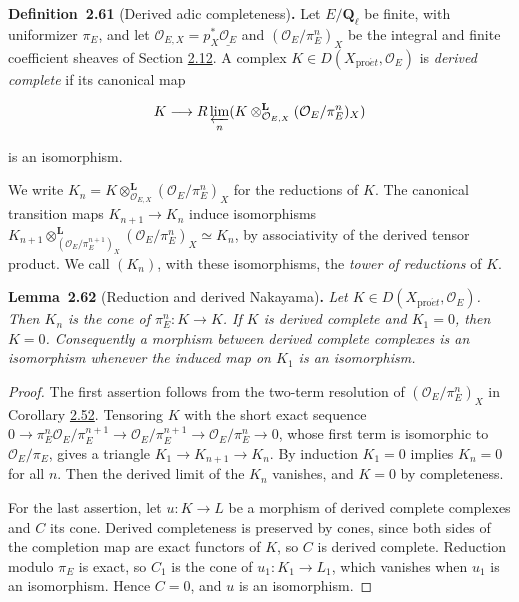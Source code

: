 \documentclass[11pt]{article}
\newenvironment{bpstatement}[2]{\par\addvspace{0.6\baselineskip}\noindent\textbf{#1}#2\textbf{.}\enspace\ignorespaces}
  {\par\addvspace{0.4\baselineskip}}
\newenvironment{bpstatementit}[2]{\begin{bpstatement}{#1}{#2}\itshape\ignorespaces}{\end{bpstatement}}
\begin{document}
\label{bp186}%
\begin{bpstatement}{Definition~2.61}{ (Derived adic completeness)}
Let \(E/\mathbf Q_\ell\) be finite, with uniformizer \(\pi_E\), and let \(\mathcal O_{E,X}=p_X^*\underline{\mathcal O_E}\) and \((\mathcal O_E/\pi_E^n)_X\) be the integral and finite coefficient sheaves of Section \hyperref[bp147]{2.12}. A complex \(K\in D(X_{\mathrm{pro}\acute{e}t},\mathcal O_E)\) is \emph{derived complete} if its canonical map

\[
K\longrightarrow R\varprojlim_n
(K\otimes^{\mathbf L}_{\mathcal O_{E,X}}(\mathcal O_E/\pi_E^{n})_X)
\]

is an isomorphism.
\end{bpstatement}

\label{bp187}%
We write \(K_n=K\otimes^{\mathbf L}_{\mathcal O_{E,X}}(\mathcal O_E/\pi_E^{n})_X\) for the reductions of \(K\). The canonical transition maps \(K_{n+1}\to K_n\) induce isomorphisms \(K_{n+1}\otimes^{\mathbf L}_{(\mathcal O_E/\pi_E^{n+1})_X}(\mathcal O_E/\pi_E^{n})_X\simeq K_n\), by associativity of the derived tensor product. We call \((K_n)\), with these isomorphisms, the \emph{tower of reductions} of \(K\).

\label{bp188}%
\begin{bpstatementit}{Lemma~2.62}{ (Reduction and derived Nakayama)}
Let \(K\in D(X_{\mathrm{pro}\acute{e}t},\mathcal O_E)\). Then \(K_n\) is the cone of \(\pi_E^n:K\to K\). If \(K\) is derived complete and \(K_1=0\), then \(K=0\). Consequently a morphism between derived complete complexes is an isomorphism whenever the induced map on \(K_1\) is an isomorphism.
\end{bpstatementit}

\begin{proof}[{Proof}]\label{bp189}%
The first assertion follows from the two-term resolution of \((\mathcal O_E/\pi_E^n)_X\) in Corollary \hyperref[bp159]{2.52}. Tensoring \(K\) with the short exact sequence \(0\to\pi_E^n\mathcal O_E/\pi_E^{n+1}\to\mathcal O_E/\pi_E^{n+1}\to
\mathcal O_E/\pi_E^n\to0\), whose first term is isomorphic to \(\mathcal O_E/\pi_E\), gives a triangle \(K_1\to K_{n+1}\to K_n\). By induction \(K_1=0\) implies \(K_n=0\) for all \(n\). Then the derived limit of the \(K_n\) vanishes, and \(K=0\) by completeness.

For the last assertion, let \(u:K\to L\) be a morphism of derived complete complexes and \(C\) its cone. Derived completeness is preserved by cones, since both sides of the completion map are exact functors of \(K\), so \(C\) is derived complete. Reduction modulo \(\pi_E\) is exact, so \(C_1\) is the cone of \(u_1:K_1\to L_1\), which vanishes when \(u_1\) is an isomorphism. Hence \(C=0\), and \(u\) is an isomorphism.
\end{proof}
\end{document}
